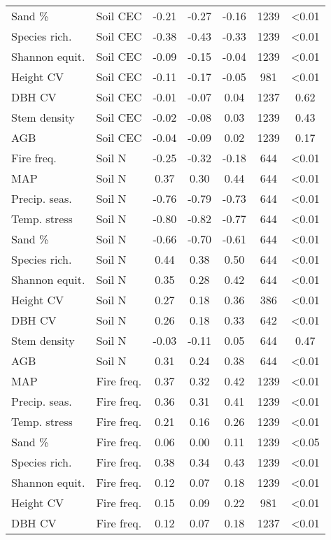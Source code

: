 \begin{longtable}[H]{llS[table-format=-1.2]S[table-format=-1.2]S[table-format=-1.2]S[table-format=4.0]S[table-format=<1.2]}
Sand \% & Soil CEC & -0.21 & -0.27 & -0.16 & 1239 & <0.01 \\ 
Species rich. & Soil CEC & -0.38 & -0.43 & -0.33 & 1239 & <0.01 \\ 
Shannon equit. & Soil CEC & -0.09 & -0.15 & -0.04 & 1239 & <0.01 \\ 
Height CV & Soil CEC & -0.11 & -0.17 & -0.05 & 981 & <0.01 \\ 
DBH CV & Soil CEC & -0.01 & -0.07 & 0.04 & 1237 & 0.62 \\ 
Stem density & Soil CEC & -0.02 & -0.08 & 0.03 & 1239 & 0.43 \\ 
AGB & Soil CEC & -0.04 & -0.09 & 0.02 & 1239 & 0.17 \\ 
Fire freq. & Soil N & -0.25 & -0.32 & -0.18 & 644 & <0.01 \\ 
MAP & Soil N & 0.37 & 0.30 & 0.44 & 644 & <0.01 \\ 
Precip. seas. & Soil N & -0.76 & -0.79 & -0.73 & 644 & <0.01 \\ 
Temp. stress & Soil N & -0.80 & -0.82 & -0.77 & 644 & <0.01 \\ 
Sand \% & Soil N & -0.66 & -0.70 & -0.61 & 644 & <0.01 \\ 
Species rich. & Soil N & 0.44 & 0.38 & 0.50 & 644 & <0.01 \\ 
Shannon equit. & Soil N & 0.35 & 0.28 & 0.42 & 644 & <0.01 \\ 
Height CV & Soil N & 0.27 & 0.18 & 0.36 & 386 & <0.01 \\ 
DBH CV & Soil N & 0.26 & 0.18 & 0.33 & 642 & <0.01 \\ 
Stem density & Soil N & -0.03 & -0.11 & 0.05 & 644 & 0.47 \\ 
AGB & Soil N & 0.31 & 0.24 & 0.38 & 644 & <0.01 \\ 
MAP & Fire freq. & 0.37 & 0.32 & 0.42 & 1239 & <0.01 \\ 
Precip. seas. & Fire freq. & 0.36 & 0.31 & 0.41 & 1239 & <0.01 \\ 
Temp. stress & Fire freq. & 0.21 & 0.16 & 0.26 & 1239 & <0.01 \\ 
Sand \% & Fire freq. & 0.06 & 0.00 & 0.11 & 1239 & <0.05 \\ 
Species rich. & Fire freq. & 0.38 & 0.34 & 0.43 & 1239 & <0.01 \\ 
Shannon equit. & Fire freq. & 0.12 & 0.07 & 0.18 & 1239 & <0.01 \\ 
Height CV & Fire freq. & 0.15 & 0.09 & 0.22 & 981 & <0.01 \\ 
DBH CV & Fire freq. & 0.12 & 0.07 & 0.18 & 1237 & <0.01 \\ 

\end{longtable}
